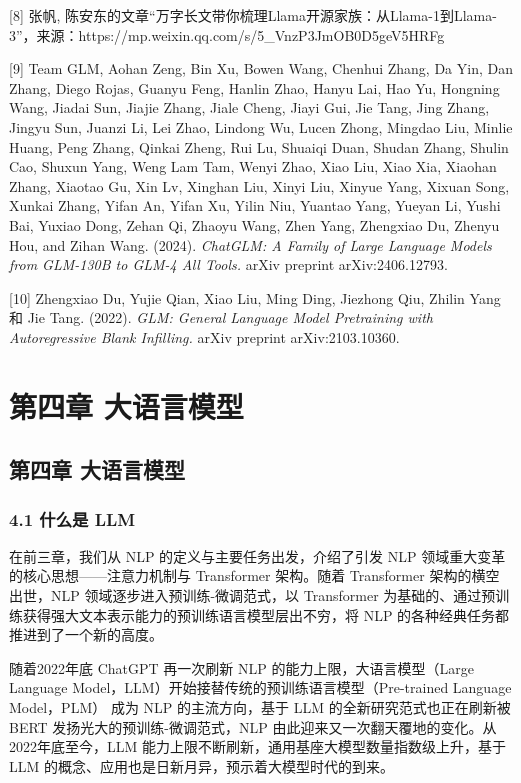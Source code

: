 \documentclass[12pt,a4paper]{book}
\begin{document}
{[}8{]} 张帆,
陈安东的文章``万字长文带你梳理Llama开源家族：从Llama-1到Llama-3''，来源：https://mp.weixin.qq.com/s/5\_VnzP3JmOB0D5geV5HRFg

{[}9{]} Team GLM, Aohan Zeng, Bin Xu, Bowen Wang, Chenhui Zhang, Da Yin,
Dan Zhang, Diego Rojas, Guanyu Feng, Hanlin Zhao, Hanyu Lai, Hao Yu,
Hongning Wang, Jiadai Sun, Jiajie Zhang, Jiale Cheng, Jiayi Gui, Jie
Tang, Jing Zhang, Jingyu Sun, Juanzi Li, Lei Zhao, Lindong Wu, Lucen
Zhong, Mingdao Liu, Minlie Huang, Peng Zhang, Qinkai Zheng, Rui Lu,
Shuaiqi Duan, Shudan Zhang, Shulin Cao, Shuxun Yang, Weng Lam Tam, Wenyi
Zhao, Xiao Liu, Xiao Xia, Xiaohan Zhang, Xiaotao Gu, Xin Lv, Xinghan
Liu, Xinyi Liu, Xinyue Yang, Xixuan Song, Xunkai Zhang, Yifan An, Yifan
Xu, Yilin Niu, Yuantao Yang, Yueyan Li, Yushi Bai, Yuxiao Dong, Zehan
Qi, Zhaoyu Wang, Zhen Yang, Zhengxiao Du, Zhenyu Hou, and Zihan Wang.
(2024). \emph{ChatGLM: A Family of Large Language Models from GLM-130B
to GLM-4 All Tools.} arXiv preprint arXiv:2406.12793.

{[}10{]} Zhengxiao Du, Yujie Qian, Xiao Liu, Ming Ding, Jiezhong Qiu,
Zhilin Yang 和 Jie Tang. (2022). \emph{GLM: General Language Model
Pretraining with Autoregressive Blank Infilling.} arXiv preprint
arXiv:2103.10360.

\chapter{第四章 大语言模型}
{
\setcounter{tocdepth}{3}
\tableofcontents
}
\section{第四章
大语言模型}\label{ux7b2cux56dbux7ae0-ux5927ux8bedux8a00ux6a21ux578b}

\subsection{4.1 什么是 LLM}\label{ux4ec0ux4e48ux662f-llm}

在前三章，我们从 NLP 的定义与主要任务出发，介绍了引发 NLP
领域重大变革的核心思想------注意力机制与 Transformer 架构。随着
Transformer 架构的横空出世，NLP 领域逐步进入预训练-微调范式，以
Transformer
为基础的、通过预训练获得强大文本表示能力的预训练语言模型层出不穷，将 NLP
的各种经典任务都推进到了一个新的高度。

随着2022年底 ChatGPT 再一次刷新 NLP 的能力上限，大语言模型（Large
Language Model，LLM）开始接替传统的预训练语言模型（Pre-trained Language
Model，PLM） 成为 NLP 的主流方向，基于 LLM 的全新研究范式也正在刷新被
BERT 发扬光大的预训练-微调范式，NLP
由此迎来又一次翻天覆地的变化。从2022年底至今，LLM
能力上限不断刷新，通用基座大模型数量指数级上升，基于 LLM
的概念、应用也是日新月异，预示着大模型时代的到来。
\end{document}
